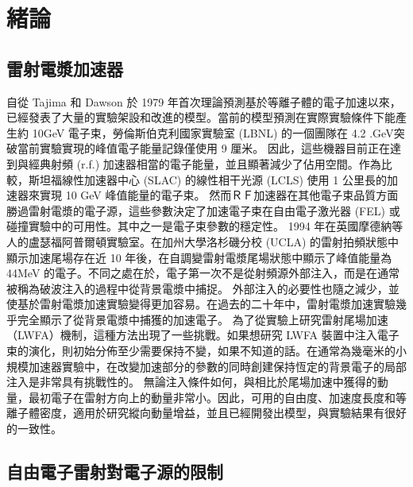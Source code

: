 
\chapter{緒論}





\section{雷射電漿加速器}
自從 Tajima 和 Dawson 於 1979 年首次理論預測基於等離子體的電子加速以來，已經發表了大量的實驗架設和改進的模型。當前的模型預測在實際實驗條件下能產生約 10GeV 電子束，勞倫斯伯克利國家實驗室 (LBNL) 的一個團隊在 4.2 .GeV突破當前實驗實現的峰值電子能量記錄僅使用 9 厘米。
因此，這些機器目前正在達到與經典射頻 (r.f.) 加速器相當的電子能量，並且顯著減少了佔用空間。作為比較，斯坦福線性加速器中心 (SLAC) 的線性相干光源 (LCLS) 使用 1 公里長的加速器來實現 10 GeV 峰值能量的電子束。
然而ＲＦ加速器在其他電子束品質方面勝過雷射電漿的電子源，這些參數決定了加速電子束在自由電子激光器 (FEL) 或碰撞實驗中的可用性。其中之一是電子束參數的穩定性。
1994 年在英國摩德納等人的盧瑟福阿普爾頓實驗室。在加州大學洛杉磯分校 (UCLA) 的雷射拍頻狀態中顯示加速尾場存在近 10 年後，在自調變雷射電漿尾場狀態中顯示了峰值能量為 44MeV 的電子。不同之處在於，電子第一次不是從射頻源外部注入，而是在通常被稱為破波注入的過程中從背景電漿中捕捉。
外部注入的必要性也隨之減少，並使基於雷射電漿加速實驗變得更加容易。在過去的二十年中，雷射電漿加速實驗幾乎完全顯示了從背景電漿中捕獲的加速電子。
為了從實驗上研究雷射尾場加速（LWFA）機制，這種方法出現了一些挑戰。如果想研究 LWFA 裝置中注入電子束的演化，則初始分佈至少需要保持不變，如果不知道的話。在通常為幾毫米的小規模加速器實驗中，在改變加速部分的參數的同時創建保持恆定的背景電子的局部注入是非常具有挑戰性的。
無論注入條件如何，與相比於尾場加速中獲得的動量，最初電子在雷射方向上的動量非常小。因此，可用的自由度、加速度長度和等離子體密度，適用於研究縱向動量增益，並且已經開發出模型，與實驗結果有很好的一致性。
\section{自由電子雷射對電子源的限制}

